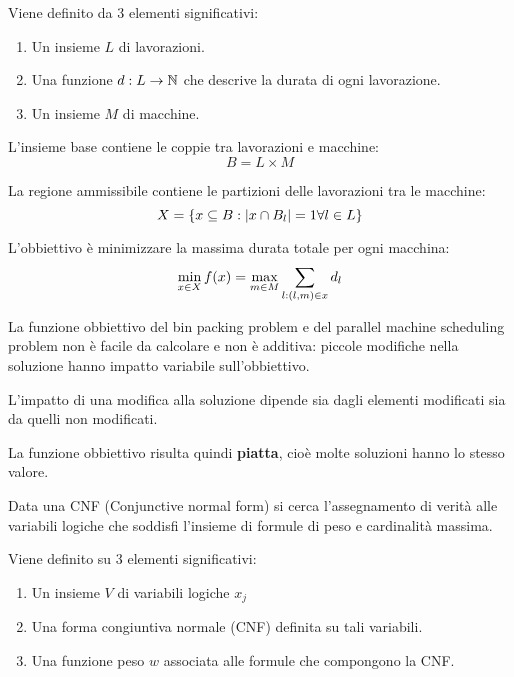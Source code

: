 \documentclass[\main/main.tex]{subfiles}
\begin{document}
\begin{multicols}{2}
\begin{problem}
        Viene definito da 3 elementi significativi:
        \begin{enumerate}
            \item Un insieme \(L\) di lavorazioni.
            \item Una funzione \(d: L\rightarrow \mathbb{N}\) che descrive la durata di ogni lavorazione.
            \item Un insieme \(M\) di macchine.
        \end{enumerate}
    \end{problem}
    \begin{definition}
        L'insieme base contiene le coppie tra lavorazioni e macchine:
        \[
            B = L \times M
        \]
    \end{definition}
    \begin{definition}
        La regione ammissibile contiene le partizioni delle lavorazioni tra le macchine:
        \[
            X = \left\{x \subseteq B: \left\lvert x \cap B_l\right\rvert = 1 \forall l \in L\right\}
        \]
    \end{definition}
    \begin{definition}
        L'obbiettivo è minimizzare la massima durata totale per ogni macchina:
        \[
            \min_{x \in X} f(x) = \max_{m \in M} \sum_{l:\left(l, m\right) \in x} d_l
        \]
    \end{definition}
    \begin{observation}
        La funzione obbiettivo del bin packing problem e del parallel machine scheduling problem non è facile da calcolare e non è additiva: piccole modifiche nella soluzione hanno impatto variabile sull'obbiettivo.
        
        L'impatto di una modifica alla soluzione dipende sia dagli elementi modificati sia da quelli non modificati.
        
        La funzione obbiettivo risulta quindi \textbf{piatta}, cioè molte soluzioni hanno lo stesso valore.
    \end{observation}
\end{multicols}
\clearpage
\begin{problem}
    Data una CNF (Conjunctive normal form) si cerca l'assegnamento di verità alle variabili logiche che soddisfi l'insieme di formule di peso e cardinalità massima.

    Viene definito su 3 elementi significativi:
    \begin{enumerate}
        \item Un insieme \(V\) di variabili logiche \(x_{j}\)
        \item Una forma congiuntiva normale (CNF) definita su tali variabili.
        \item Una funzione peso \(w\) associata alle formule che compongono la CNF.
    \end{enumerate}
\end{problem}
\end{document}
